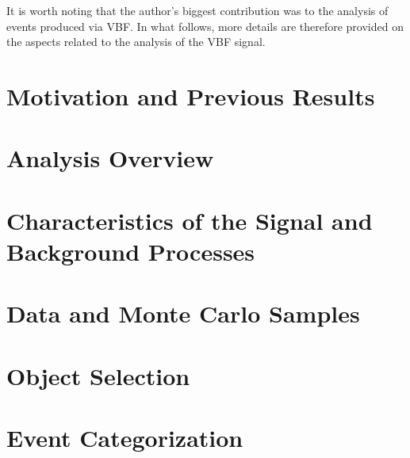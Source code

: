 It is worth noting that the author's biggest contribution was to the analysis of \HWW events produced via VBF. In what follows, more details are therefore provided on the aspects related to the analysis of the VBF signal.



\section{Motivation and Previous Results}
\label{sec:motivation}


\section{Analysis Overview}
\label{sec:analysis-overview}


\section{Characteristics of the Signal and Background Processes}
\label{sec:signal-bkg-characteristics}



\section{Data and Monte Carlo Samples}
\label{sec:data-mc-samples}



\section{Object Selection}
\label{sec:object-selection}



\section{Event Categorization}
\label{sec:event-categorization}



